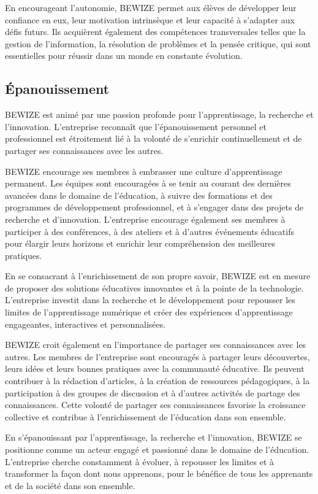 En encourageant l'autonomie, BEWIZE permet aux élèves de développer leur confiance en eux, leur motivation intrinsèque et leur capacité à s'adapter aux défis futurs. Ils acquièrent également des compétences transversales telles que la gestion de l'information, la résolution de problèmes et la pensée critique, qui sont essentielles pour réussir dans un monde en constante évolution.

\subsection{Épanouissement} 
BEWIZE est animé par une passion profonde pour l'apprentissage, la recherche et l'innovation. L'entreprise reconnaît que l'épanouissement personnel et professionnel est étroitement lié à la volonté de s'enrichir continuellement et de partager ses connaissances avec les autres.

BEWIZE encourage ses membres à embrasser une culture d'apprentissage permanent. Les équipes sont encouragées à se tenir au courant des dernières avancées dans le domaine de l'éducation, à suivre des formations et des programmes de développement professionnel, et à s'engager dans des projets de recherche et d'innovation. L'entreprise encourage également ses membres à participer à des conférences, à des ateliers et à d'autres événements éducatifs pour élargir leurs horizons et enrichir leur compréhension des meilleures pratiques.

En se consacrant à l'enrichissement de son propre savoir, BEWIZE est en mesure de proposer des solutions éducatives innovantes et à la pointe de la technologie. L'entreprise investit dans la recherche et le développement pour repousser les limites de l'apprentissage numérique et créer des expériences d'apprentissage engageantes, interactives et personnalisées.

BEWIZE croit également en l'importance de partager ses connaissances avec les autres. Les membres de l'entreprise sont encouragés à partager leurs découvertes, leurs idées et leurs bonnes pratiques avec la communauté éducative. Ils peuvent contribuer à la rédaction d'articles, à la création de ressources pédagogiques, à la participation à des groupes de discussion et à d'autres activités de partage des connaissances. Cette volonté de partager ses connaissances favorise la croissance collective et contribue à l'enrichissement de l'éducation dans son ensemble.

En s'épanouissant par l'apprentissage, la recherche et l'innovation, BEWIZE se positionne comme un acteur engagé et passionné dans le domaine de l'éducation. L'entreprise cherche constamment à évoluer, à repousser les limites et à transformer la façon dont nous apprenons, pour le bénéfice de tous les apprenants et de la société dans son ensemble.

